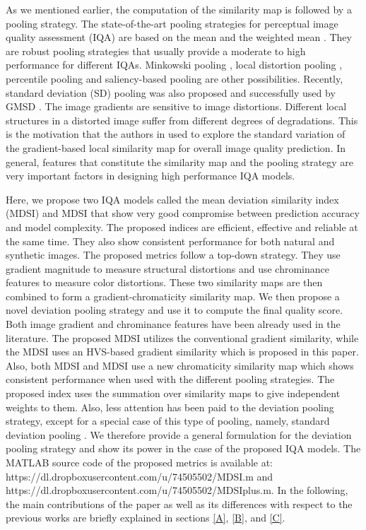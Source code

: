 As we mentioned earlier, the computation of the similarity map is followed by a pooling strategy. The state-of-the-art pooling strategies for perceptual image quality assessment (IQA) are based on the mean and the weighted mean \cite{SSIM, MSSSIM, IWSSIM, GS, FSIM, RFSIM}. They are robust pooling strategies that usually provide a moderate to high performance for different IQAs. Minkowski pooling \cite{spatial2006}, local distortion pooling \cite{spatial2006, pooling2009, MAD}, percentile pooling \cite{percentile2009} and saliency-based pooling \cite{SRSIM, VSI} are other possibilities. Recently, standard deviation (SD) pooling was also proposed and successfully used by GMSD \cite{GMSD}. The image gradients are sensitive to image distortions. Different local structures in a distorted image suffer from different degrees of degradations. This is the motivation
that the authors in \cite{GMSD} used to explore the standard variation
of the gradient-based local similarity map for overall image
quality prediction. In general, features that constitute the similarity map and the pooling strategy are very important factors in designing high performance IQA models. 



Here, we propose two IQA models called the mean deviation similarity index (MDSI) and MDSI that show very good compromise between prediction accuracy and model complexity. The proposed indices are efficient, effective and reliable at the same time. They also show consistent performance for both natural and synthetic images. The proposed metrics follow a top-down strategy. They use gradient magnitude to measure structural distortions and use chrominance features to measure color distortions. These two similarity maps are then combined to form a gradient-chromaticity similarity map. We then propose a novel deviation pooling strategy and use it to compute the final quality score. Both image gradient \cite{GSSIM, gradient2010, GS, FSIM, GMSD, VSI} and chrominance features \cite{FSIM, VSI} have been already used in the literature. The proposed MDSI utilizes the conventional gradient similarity, while the MDSI uses an HVS-based gradient similarity which is proposed in this paper. Also, both MDSI and MDSI use a new chromaticity similarity map which shows consistent performance when used with the different pooling strategies. The proposed index uses the summation over similarity maps to give independent weights to them. Also, less attention has been paid to the deviation pooling strategy, except for a special case of this type of pooling, namely, standard deviation pooling \cite{GMSD}. We therefore provide a general formulation for the deviation pooling strategy and show its power in the case of the proposed IQA models. The MATLAB source code of the proposed metrics is available at: https://dl.dropboxusercontent.com/u/74505502/MDSI.m and https://dl.dropboxusercontent.com/u/74505502/MDSIplus.m. In the following, the main contributions of the paper as well as its differences with respect to the previous works are briefly explained in sections \ref{A}, \ref{B}, and \ref{C}. 

